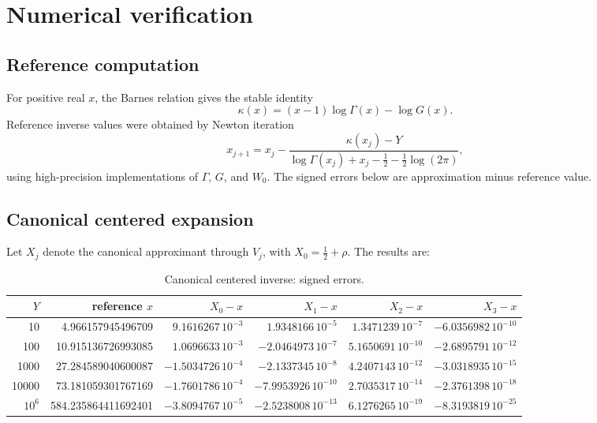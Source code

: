 \documentclass[11pt,a4paper]{article}
\numberwithin{equation}{section}
\theoremstyle{remark}
\begin{document}
\section{Numerical verification}
\label{sec:numerics}

\subsection{Reference computation}

For positive real \(x\), the Barnes relation gives the stable identity
\begin{equation}
\kappa(x)=(x-1)\log\Gamma(x)-\log G(x).
\label{eq:numeric-logK}
\end{equation}
Reference inverse values were obtained by Newton iteration
\begin{equation}
x_{j+1}=x_j-
\frac{\kappa(x_j)-Y}
{\log\Gamma(x_j)+x_j-\tfrac12-\tfrac12\log(2\pi)},
\label{eq:newton-K}
\end{equation}
using high-precision implementations of \(\Gamma\), \(G\), and \(W_0\).
The signed errors below are approximation minus reference value.

\subsection{Canonical centered expansion}

Let \(X_j\) denote the canonical approximant through \(V_j\), with
\(X_0=\tfrac12+\rho\).  The results are:

\begin{table}[htbp]
\centering
\scriptsize
\caption{Canonical centered inverse: signed errors.}
\label{tab:canonical-errors}
\begin{tabular}{@{}r r r r r r@{}}
\toprule
\(Y\) & reference \(x\) & \(X_0-x\) & \(X_1-x\) & \(X_2-x\) & \(X_3-x\)\\
\midrule
10
& 4.966157945496709
& \(9.1616267\,10^{-3}\)
& \(1.9348166\,10^{-5}\)
& \(1.3471239\,10^{-7}\)
& \(-6.0356982\,10^{-10}\)\\
100
& 10.915136726993085
& \(1.0696633\,10^{-3}\)
& \(-2.0464973\,10^{-7}\)
& \(5.1650691\,10^{-10}\)
& \(-2.6895791\,10^{-12}\)\\
1000
& 27.284589040600087
& \(-1.5034726\,10^{-4}\)
& \(-2.1337345\,10^{-8}\)
& \(4.2407143\,10^{-12}\)
& \(-3.0318935\,10^{-15}\)\\
10000
& 73.181059301767169
& \(-1.7601786\,10^{-4}\)
& \(-7.9953926\,10^{-10}\)
& \(2.7035317\,10^{-14}\)
& \(-2.3761398\,10^{-18}\)\\
\(10^6\)
& 584.235864411692401
& \(-3.8094767\,10^{-5}\)
& \(-2.5238008\,10^{-13}\)
& \(6.1276265\,10^{-19}\)
& \(-8.3193819\,10^{-25}\)\\
\bottomrule
\end{tabular}
\end{table}
\end{document}
